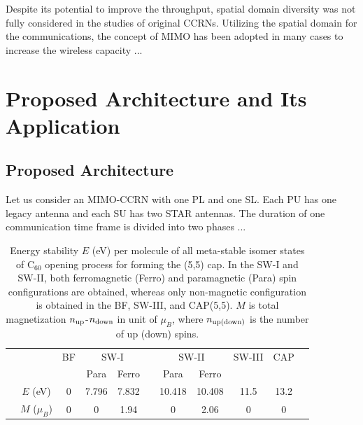 \documentclass[master,english,final]{kaist-ucs}
\begin{document}
	Despite its potential to improve the throughput, spatial domain diversity was not fully considered in the studies of original CCRNs. Utilizing the spatial domain for the communications, the concept of MIMO has been adopted in many cases to increase the wireless capacity \cite{EF1,FD2}...


	\chapter{Proposed Architecture and Its Application}

	\section{Proposed Architecture}

	Let us consider an MIMO-CCRN with one PL and one SL. Each PU has one legacy antenna and each SU has two STAR antennas. The duration of one communication time frame is divided into two phases \cite{RVP2,ML2} ...
	\begin{table}[t]
		\caption[Enter the caption title here]{Energy stability $E$ (eV) per molecule of all meta-stable
			isomer states of C$_{60}$ opening process for forming the (5,5) cap.
			In the SW-I and SW-II, both ferromagnetic (Ferro) and paramagnetic (Para)
			spin configurations are obtained, whereas only non-magnetic configuration
			is obtained in the BF, SW-III, and CAP(5,5).
			$M$ is total magnetization $n_{\rm up}$-$n_{\rm down}$ in unit of $\mu_B$, where
			$n_{\rm up(down)}$ is the number of up (down) spins.
		}
		\label{mag-tab1}
		\begin{center}
			\begin{tabular} {ccccccccccc}
				\hline\hline
				& & BF &\multicolumn{2}{c}{SW-I}&&\multicolumn{2}{c}{SW-II}&SW-III&CAP&\\
				\cline{4-5} \cline{7-8}
				&               &   &  Para & Ferro &&   Para &  Ferro &      &      &\\
				\hline
				& $E$ (eV)      & 0 & 7.796 & 7.832 && 10.418 & 10.408 & 11.5 & 13.2 &\\
				& $M$ ($\mu_B$) & 0 &     0 &  1.94 &&      0 &   2.06 &    0 &    0 &\\
				\hline\hline
			\end{tabular}
		\end{center}
	\end{table}
\end{document}
